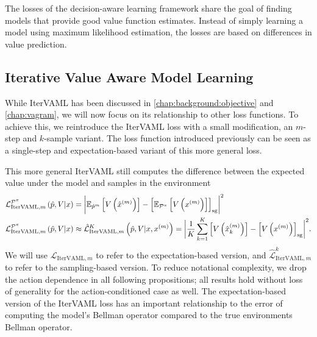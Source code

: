 The losses of the decision-aware learning framework share the goal of finding models that provide good value function estimates.
Instead of simply learning a model using maximum likelihood estimation, the losses are based on differences in value prediction.

\subsection{Iterative Value Aware Model Learning}

While IterVAML has been discussed in \autoref{chap:background:objective} and \autoref{chap:vagram}, we will now focus on its relationship to other loss functions.
To achieve this, we reintroduce the IterVAML loss with a small modification, an $m$-step and $k$-sample variant.
The loss function introduced previously can be seen as a single-step and expectation-based variant of this more general loss.

This more general IterVAML still computes the difference between the expected value under the model and samples in the environment
\begin{equation}\label{eq:cvaml:itervaml}
\begin{aligned}
     &{\mathcal{L}}^{\mathcal{P}^\pi}_{\mathrm{IterVAML}, m}\left(\hat{p},V|x\right) = \biggl|\mathbb{E}_{\hat{p}^m} \left[ V\left( \hat{x}^{(m)} \right) \right] - 
    \left[ \mathbb{E}_{\mathcal{P}^\pi}\left[  V\left( x^{(m)} \right) \right] \right]_\mathrm{sg}\biggr|^2 \\
    & {\mathcal{L}}^{\mathcal{P}^\pi}_{\mathrm{IterVAML}, m}\left(\hat{p},V|x\right) \approx \hat{{\mathcal{L}}}^K_{\mathrm{IterVAML}, m}\left(\hat{p},V|x, x^{(m)}\right) = \biggl|\frac{1}{K}\sum_{k=1}^K \left[ V\left( \hat{x}_k^{(m)} \right) \right] - 
    \left[ V\left( x^{(m)} \right) \right]_\mathrm{sg}\biggr|^2. 
\end{aligned}
\end{equation}
We will use $\mathcal{L}_{\mathrm{IterVAML}, m}$ to refer to the expectation-based version, and $\hat{\mathcal{L}}^k_{\mathrm{IterVAML}, m}$ to refer to the sampling-based version.
To reduce notational complexity, we drop the action dependence in all following propositions; all results hold without loss of generality for the action-conditioned case as well.
The expectation-based version of the IterVAML loss has an important relationship to the error of computing the model's Bellman operator compared to the true environments Bellman operator.

